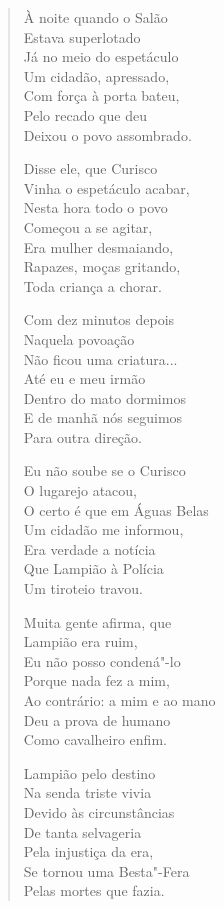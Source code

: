 \begin{verse}
À noite quando o Salão \\
Estava superlotado \\
Já no meio do espetáculo \\
Um cidadão, apressado, \\
Com força à porta bateu, \\
Pelo recado que deu \\
Deixou o povo assombrado. 


Disse ele, que Curisco \\
Vinha o espetáculo acabar, \\
Nesta hora todo o povo \\
Começou a se agitar, \\
Era mulher desmaiando, \\
Rapazes, moças gritando, \\
Toda criança a chorar. 

Com dez minutos depois \\
Naquela povoação \\
Não ficou uma criatura... \\
Até eu e meu irmão \\
Dentro do mato dormimos \\
E de manhã nós seguimos \\
Para outra direção. 

Eu não soube se o Curisco \\
O lugarejo atacou, \\
O certo é que em Águas Belas \\
Um cidadão me informou, \\
Era verdade a notícia \\
Que Lampião à Polícia \\
Um tiroteio travou. 

Muita gente afirma, que \\
Lampião era ruim, \\
Eu não posso condená"-lo \\
Porque nada fez a mim, \\
Ao contrário: a mim e ao mano \\
Deu a prova de humano \\
Como cavalheiro enfim. 


Lampião pelo destino \\
Na senda triste vivia \\
Devido às circunstâncias \\
De tanta selvageria \\
Pela injustiça da era, \\
Se tornou uma Besta"-Fera \\
Pelas mortes que fazia. 


\end{verse}
